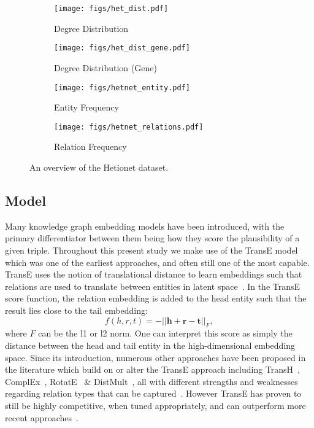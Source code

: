 \begin{figure*}[!ht]
	\centering
	\begin{subfigure}[b]{0.3\textwidth}
		\centering
		\texttt{[image: figs/het\_dist.pdf]}
		\caption{Degree Distribution}\label{fig:hetionet:full}
	\end{subfigure}
	\begin{subfigure}[b]{0.3\textwidth}
		\centering
		\texttt{[image: figs/het\_dist\_gene.pdf]}
		\caption{Degree Distribution (Gene)}\label{fig:hetionet:gene}
	\end{subfigure}
	\begin{subfigure}[b]{0.365\textwidth}
		\centering
		\texttt{[image: figs/hetnet\_entity.pdf]}
		\caption{Entity Frequency}\label{fig:hetionet:ef}
	\end{subfigure}

	\begin{subfigure}[b]{0.5\textwidth}
		\centering
		\texttt{[image: figs/hetnet\_relations.pdf]}
		\caption{Relation Frequency}\label{fig:hetionet:rf}
	\end{subfigure}
	\caption{An overview of the Hetionet dataset.}
	\label{fig:hetionet}
\end{figure*}

\subsection{Model}\label{sec:model}

Many knowledge graph embedding models have been introduced, with the primary differentiator between them being how they score the plausibility of a given triple. Throughout this present study we make use of the TransE model which was one of the earliest approaches, and often still one of the most capable. TransE uses the notion of translational distance to learn embeddings such that relations are used to translate between entities in latent space~\cite{bordes2013translating}. In the TransE score function, the relation embedding is added to the head entity such that the result lies close to the tail embedding:
\[ f(h,r,t) =  -|| \mathbf{h} + \mathbf{r} - \mathbf{t}||_F, \]
where \(F\) can be the l1 or l2 norm. One can interpret this score as simply the distance between the head and tail entity in the high-dimensional embedding space. Since its introduction, numerous other approaches have been proposed in the literature which build on or alter the TransE approach including TransH~\cite{wang2014knowledge}, ComplEx~\cite{trouillon2016complex}, RotatE~\cite{sun2019rotate} \& DistMult~\cite{yang2015embedding}, all with different strengths and weaknesses regarding relation types that can be captured~\cite{rossi2021knowledge}. However TransE has proven to still be highly competitive, when tuned appropriately, and can outperform more recent approaches~\cite{bonner2021understanding}.

